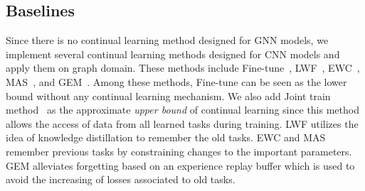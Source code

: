 \documentclass[letterpaper]{article} %
\begin{document}

\subsection{Baselines}
Since there is no continual learning method designed for GNN models, we implement several continual learning methods designed for CNN models and apply them on graph domain.
These methods include Fine-tune~\cite{girshick2014rich}, 
LWF~\cite{li2017learning}, EWC~\cite{kirkpatrick2017overcoming}, 
MAS~\cite{aljundi2018memory}, and GEM~\cite{lopez2017gradient}.
Among these methods, Fine-tune can be seen as the lower bound
without any continual learning mechanism.
We also add Joint train method~\cite{caruana1997multitask} 
as the approximate \textit{upper bound} of
continual learning since this method allows the access of data from all learned tasks
during training.
LWF utilizes the idea of knowledge distillation to remember the old tasks.
EWC and MAS remember previous tasks by constraining changes to the important parameters.
GEM alleviates forgetting based on an experience replay buffer 
which is used to 
avoid the increasing of losses associated to old tasks.
\end{document}
